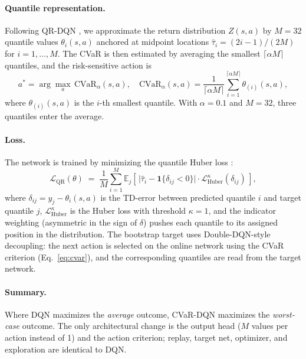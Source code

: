 \documentclass[a4paper,11pt]{article}
\theoremstyle{definition}
\begin{document}
\paragraph{Quantile representation.} Following QR-DQN \citep{dabney2018}, we approximate the return distribution $Z(s, a)$ by $M = 32$ quantile values $\theta_i(s, a)$ anchored at midpoint locations $\hat\tau_i = (2i - 1)/(2M)$ for $i = 1, \ldots, M$. The CVaR is then estimated by averaging the smallest $\lceil \alpha M \rceil$ quantiles, and the risk-sensitive action is
\begin{equation}
    a^* = \arg\max_a \, \mathrm{CVaR}_\alpha(s, a), \quad
    \mathrm{CVaR}_\alpha(s, a) = \frac{1}{\lceil \alpha M \rceil} \sum_{i=1}^{\lceil \alpha M \rceil} \theta_{(i)}(s, a),
    \label{eq:cvar}
\end{equation}
where $\theta_{(i)}(s, a)$ is the $i$-th smallest quantile. With $\alpha = 0.1$ and $M = 32$, three quantiles enter the average.

\paragraph{Loss.} The network is trained by minimizing the quantile Huber loss \citep{dabney2018}:
\begin{equation}
    \mathcal{L}_\text{QR}(\theta) \;=\; \frac{1}{M} \sum_{i=1}^{M} \mathbb{E}_{j}\!\left[\,\bigl|\hat\tau_i - \mathbf{1}\{\delta_{ij} < 0\}\bigr| \cdot \mathcal{L}^\kappa_\text{Huber}(\delta_{ij})\,\right],
    \label{eq:qrloss}
\end{equation}
where $\delta_{ij} = y_j - \theta_i(s, a)$ is the TD-error between predicted quantile $i$ and target quantile $j$, $\mathcal{L}^\kappa_\text{Huber}$ is the Huber loss with threshold $\kappa = 1$, and the indicator weighting (asymmetric in the sign of $\delta$) pushes each quantile to its assigned position in the distribution. The bootstrap target uses Double-DQN-style decoupling: the next action is selected on the online network using the CVaR criterion (Eq.~\ref{eq:cvar}), and the corresponding quantiles are read from the target network.

\paragraph{Summary.} Where DQN maximizes the \emph{average} outcome, CVaR-DQN maximizes the \emph{worst-case} outcome. The only architectural change is the output head ($M$ values per action instead of 1) and the action criterion; replay, target net, optimizer, and exploration are identical to DQN.
\end{document}
